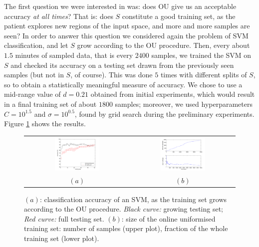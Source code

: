 The first question we were interested in was: does OU give us an
acceptable accuracy \emph{at all times}? That is: does $S$ constitute
a good training set, as the patient explores new regions of the input
space, and more and more samples are seen? In order to answer this
question we considered again the problem of SVM classification, and
let $S$ grow according to the OU procedure. Then, every about $1.5$
minutes of sampled data, that is every $2400$ samples, we trained the
SVM on $S$ and checked its accuracy on a testing set drawn from the
previously seen samples (but not in $S$, of course). This was done $5$
times with different splits of $S$, so to obtain a statistically
meaningful measure of accuracy. We chose to use a mid-range value of
$d = 0.21$ obtained from initial experiments, which would
result in a final training set of about $1800$ samples; moreover, we
used hyperparameters $C = 10^{1.5}$ and $\sigma = 10^{0.5}$, found by
grid search during the preliminary experiments. Figure \ref{fig:inc}
shows the results.

\begin{figure}[!ht] \centering
  \begin{tabular}{cc}
    \includegraphics[width=0.45\textwidth]{figs/fig_resInc_OU21} &
    \includegraphics[width=0.45\textwidth]{figs/fig_growth_OU21} \\
    $(a)$ & $(b)$ \\
  \end{tabular}
  \caption{$(a)$: classification accuracy of an SVM, as the training set
    grows according to the OU procedure. \emph{Black curve:}
    growing testing set; \emph{Red curve:} full testing set. $(b)$:
    size of the online uniformised training set: number of samples
    (upper plot), fraction of the whole training set (lower plot).}
  \label{fig:inc}
\end{figure}

